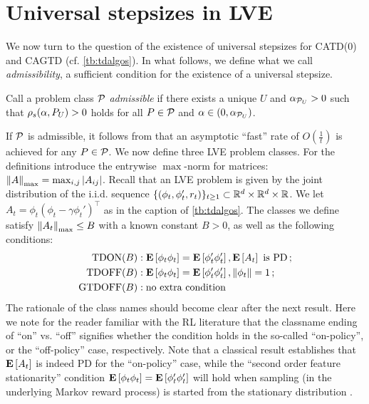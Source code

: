 \section{Universal stepsizes in LVE}\label{sec:rl}
We now turn to the question of the existence of universal stepsizes for CATD(0) and CAGTD (cf. \cref{tb:tdalgos}). 
In what follows, we define what we call \emph{admissibility}, 
a sufficient condition for the existence of a universal stepsize. 
\begin{definition}\label{def:admis}
Call a problem class $\P$ \emph{admissible} if there exists a unique $U$ and $\alpha_{\P_U}>0$ such that
$\rhos{P_U}>0$ holds for all $P\in \P$ and $\alpha\in(0,\alpha_{\P_U})$.
\end{definition}
If $\P$ is admissible, it  follows from  that an asymptotic ``fast'' rate of $O(\frac1t)$ is achieved for any $P\in \cP$. 
We now define three LVE problem classes. For the definitions introduce
the entrywise $\max$-norm for matrices: $\norm{A}_{\max} = \max_{i,j} |A_{ij}|$.
Recall that an LVE problem is given by the joint distribution of the i.i.d. sequence
$\{(\phi_t,\phi_t',r_t)\}_{t\ge 1}\subset \R^d\times \R^d \times \R$. We let 
$A_t = \phi_t(\phi_t - \gamma \phi_t')^\top$ as in the caption of \cref{tb:tdalgos}.
The classes we define satisfy $\norm{A_t}_{\max}\le B$ with a known constant $B>0$, 
as well as the following conditions:
\begin{align*}
\text{TDON}(B)&: \EE{\phi_t\phi_t}=\EE{\phi'_t\phi'_t}, \EE{A_t} \text{ is PD}\,;\\
\text{TDOFF}(B)&: \EE{\phi_t\phi_t}=\EE{\phi'_t\phi'_t}, \norm{\phi_t}=1\,;\\
\text{GTDOFF}(B)&: \text{no extra condition}
\end{align*}
The rationale of the class names should become clear after the next result.
Here we note for the reader familiar with the RL literature that the classname ending of ``on'' vs. ``off'' signifies
whether the condition holds in the so-called ``on-policy'', or the ``off-policy'' case, respectively.
Note that a classical result establishes that $\EE{A_t}$ is indeed PD for the ``on-policy'' case, 
while the ``second order feature stationarity'' condition $ \EE{\phi_t\phi_t}=\EE{\phi'_t\phi'_t}$ will hold 
when sampling (in the underlying Markov reward process) 
is started from the stationary distribution \cite{sut95}. 
\FloatBarrier
